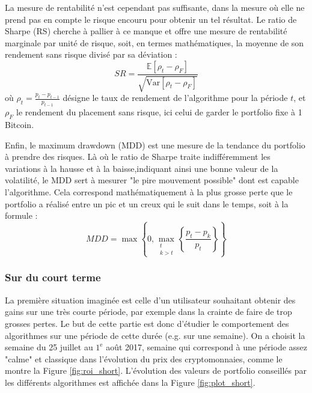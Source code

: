 \documentclass[a4paper, 10pt]{article}
\newcommand{\Var}{\mathrm{Var}}
\begin{document}
La mesure de rentabilité n'est cependant pas suffisante, dans la mesure où elle ne prend pas en compte le risque encouru pour obtenir un tel résultat. Le ratio de Sharpe (RS) \cite{Sharpe1994} cherche à pallier à ce manque et offre une mesure de rentabilité marginale par unité de risque, soit, en termes mathématiques, la moyenne de son rendement sans risque divisé par sa déviation :
\begin{equation}
    SR = \frac{\mathbb{E} \left[ \rho_t - \rho_F \right]}{\sqrt{\Var \left[ \rho_t - \rho_F \right]}}
\end{equation}
où $\rho_t = \frac{p_t - p_{t-1}}{p_{t-1}}$ désigne le taux de rendement de l'algorithme pour la période $t$, et $\rho_F$ le rendement du placement sans risque, ici celui de garder le portfolio fixe à 1 Bitcoin.

Enfin, le maximum drawdown (MDD) \cite{Magdon2004} est une mesure de la tendance du portfolio à prendre des risques. Là où le ratio de Sharpe traite indifféremment les variations à la hausse et à la baisse,indiquant ainsi une bonne valeur de la volatilité, le MDD sert à mesurer "le pire mouvement possible" dont est capable l'algorithme. Cela correspond mathématiquement à la plus grosse perte que le portfolio a réalisé entre un pic et un creux qui le suit dans le temps, soit à la formule : 
\begin{equation}
    MDD = \max \left \{ 0, \max\limits_{\substack{t \\ k > t}} \left \{ \frac{p_t - p_k}{p_t} \right \} \right \}
\end{equation}

\subsubsection{Sur du court terme}
\label{sec:theorie_empiriqu_court}

La première situation imaginée est celle d'un utilisateur souhaitant obtenir des gains sur une très courte période, par exemple dans la crainte de faire de trop grosses pertes. Le but de cette partie est donc d'étudier le comportement des algorithmes sur une période de cette durée (e.g. sur une semaine). On a choisit la semaine du 25 juillet au $1^{\text{e}}$ août 2017, semaine qui correspond à une période assez "calme" et classique dans l'évolution du prix des cryptomonnaies, comme le montre la Figure \ref{fig:roi_short}. L'évolution des valeurs de portfolio conseillés par les différents algorithmes est affichée dans la Figure \ref{fig:plot_short}.
\end{document}
